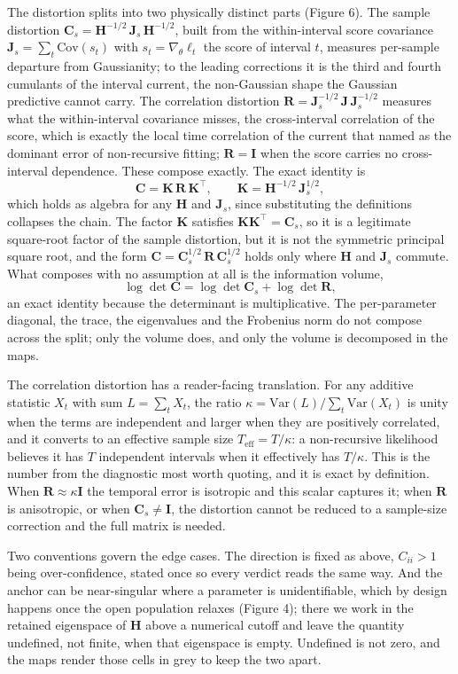 The distortion splits into two physically distinct parts (Figure 6). The sample distortion $\mathbf{C}_s=\mathbf{H}^{-1/2}\,\mathbf{J}_s\,\mathbf{H}^{-1/2}$, built from the within-interval score covariance $\mathbf{J}_s=\sum_t\mathrm{Cov}(s_t)$ with $s_t=\nabla_\theta\ell_t$ the score of interval $t$, measures per-sample departure from Gaussianity; to the leading corrections it is the third and fourth cumulants of the interval current, the non-Gaussian shape the Gaussian predictive cannot carry. The correlation distortion $\mathbf{R}=\mathbf{J}_s^{-1/2}\,\mathbf{J}\,\mathbf{J}_s^{-1/2}$ measures what the within-interval covariance misses, the cross-interval correlation of the score, which is exactly the local time correlation of the current that \cite{milescu2005maximum} named as the dominant error of non-recursive fitting; $\mathbf{R}=\mathbf{I}$ when the score carries no cross-interval dependence. These compose exactly. The exact identity is
\[ \mathbf{C}=\mathbf{K}\,\mathbf{R}\,\mathbf{K}^\top,\qquad \mathbf{K}=\mathbf{H}^{-1/2}\,\mathbf{J}_s^{1/2}, \]
which holds as algebra for any $\mathbf{H}$ and $\mathbf{J}_s$, since substituting the definitions collapses the chain. The factor $\mathbf{K}$ satisfies $\mathbf{K}\mathbf{K}^\top=\mathbf{C}_s$, so it is a legitimate square-root factor of the sample distortion, but it is not the symmetric principal square root, and the form $\mathbf{C}=\mathbf{C}_s^{1/2}\,\mathbf{R}\,\mathbf{C}_s^{1/2}$ holds only where $\mathbf{H}$ and $\mathbf{J}_s$ commute. What composes with no assumption at all is the information volume,
\[ \log\det\mathbf{C}=\log\det\mathbf{C}_s+\log\det\mathbf{R}, \]
an exact identity because the determinant is multiplicative. The per-parameter diagonal, the trace, the eigenvalues and the Frobenius norm do not compose across the split; only the volume does, and only the volume is decomposed in the maps.

The correlation distortion has a reader-facing translation. For any additive statistic $X_t$ with sum $L=\sum_t X_t$, the ratio $\kappa=\mathrm{Var}(L)\big/\sum_t\mathrm{Var}(X_t)$ is unity when the terms are independent and larger when they are positively correlated, and it converts to an effective sample size $T_\mathrm{eff}=T/\kappa$: a non-recursive likelihood believes it has $T$ independent intervals when it effectively has $T/\kappa$. This is the number from the diagnostic most worth quoting, and it is exact by definition. When $\mathbf{R}\approx\kappa\mathbf{I}$ the temporal error is isotropic and this scalar captures it; when $\mathbf{R}$ is anisotropic, or when $\mathbf{C}_s\neq\mathbf{I}$, the distortion cannot be reduced to a sample-size correction and the full matrix is needed.

Two conventions govern the edge cases. The direction is fixed as above, $C_{ii}>1$ being over-confidence, stated once so every verdict reads the same way. And the anchor can be near-singular where a parameter is unidentifiable, which by design happens once the open population relaxes (Figure 4); there we work in the retained eigenspace of $\mathbf{H}$ above a numerical cutoff and leave the quantity undefined, not finite, when that eigenspace is empty. Undefined is not zero, and the maps render those cells in grey to keep the two apart.
